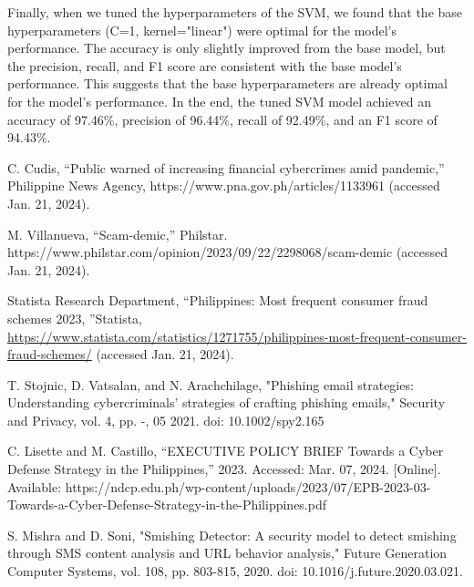 \documentclass[conference]{IEEEtran}
\begin{document}
Finally, when we tuned the hyperparameters of the SVM, we found that the base hyperparameters (C=1, kernel="linear") were optimal for the model's performance. The accuracy is only slightly improved from the base model, but the precision, recall, and F1 score are consistent with the base model's performance. This suggests that the base hyperparameters are already optimal for the model's performance. In the end, the tuned SVM model achieved an accuracy of 97.46\%, precision of 96.44\%, recall of 92.49\%, and an F1 score of 94.43\%.


\begin{thebibliography}{00}

     C. Cudis, ``Public warned of increasing financial cybercrimes amid pandemic,'' Philippine News Agency, https://www.pna.gov.ph/articles/1133961 (accessed Jan. 21, 2024). 

     M. Villanueva, ``Scam-demic,'' Philstar. https://www.philstar.com/opinion/2023/09/22/2298068/scam-demic (accessed Jan. 21, 2024).

     Statista Research Department, ``Philippines: Most frequent consumer fraud schemes 2023, ''Statista, \url{https://www.statista.com/statistics/1271755/philippines-most-frequent-consumer-fraud-schemes/} (accessed Jan. 21, 2024). 

    T. Stojnic, D. Vatsalan, and N. Arachchilage, "Phishing email strategies: Understanding cybercriminals' strategies of crafting phishing emails," Security and Privacy, vol. 4, pp. -, 05 2021. doi: 10.1002/spy2.165

    C. Lisette and M. Castillo, “EXECUTIVE POLICY BRIEF Towards a Cyber Defense Strategy in the Philippines,” 2023. Accessed: Mar. 07, 2024. [Online]. Available: https://ndcp.edu.ph/wp-content/uploads/2023/07/EPB-2023-03-Towards-a-Cyber-Defense-Strategy-in-the-Philippines.pdf

    S. Mishra and D. Soni, "Smishing Detector: A security model to detect smishing through SMS content analysis and URL behavior analysis," Future Generation Computer Systems, vol. 108, pp. 803-815, 2020. doi: 10.1016/j.future.2020.03.021.


\end{thebibliography}
\end{document}
